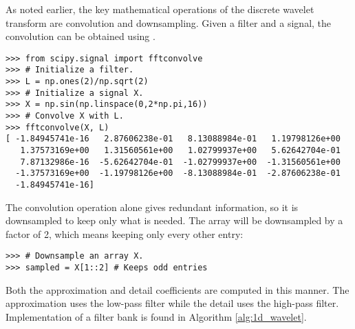 \begin{comment}
At each stage of the algorithm, we filter the signal into an approximation and its details.
Note that the algorithm returns a sequence of one dimensional arrays
\[A_n, D_n, D_{n-1}, \ldots, D_1.\]
If the input signal $X$ has length $2^m$ for
some $m \geq n$ and we are using the Haar wavelet, then $A_n$ has length $2^{m-n}$, and $D_i$ has length $2^{m-i}$
for $i=1,\ldots,n$. The arrays $D_i$ are outputs of the high-pass filter, and thus represent high-frequency
details.
Hence, these arrays are known as \emph{details}.
The array $A_n$ is computed by recursively passing the signal through the low-pass filter, and hence it
represents the low-frequency structure in the signal.
In fact, $A_n$ can be seen as a smoothed approximation of the original signal, and is called the \emph{approximation}.
\end{comment}

As noted earlier, the key mathematical operations of the discrete wavelet transform are convolution and downsampling.
Given a filter and a signal, the convolution can be obtained using .
\begin{lstlisting}
>>> from scipy.signal import fftconvolve
>>> # Initialize a filter.
>>> L = np.ones(2)/np.sqrt(2)
>>> # Initialize a signal X.
>>> X = np.sin(np.linspace(0,2*np.pi,16))
>>> # Convolve X with L.
>>> fftconvolve(X, L)
[ -1.84945741e-16   2.87606238e-01   8.13088984e-01   1.19798126e+00
   1.37573169e+00   1.31560561e+00   1.02799937e+00   5.62642704e-01
   7.87132986e-16  -5.62642704e-01  -1.02799937e+00  -1.31560561e+00
  -1.37573169e+00  -1.19798126e+00  -8.13088984e-01  -2.87606238e-01
  -1.84945741e-16]
\end{lstlisting}

The convolution operation alone gives redundant information, so it is downsampled to keep only what is needed.
The array will be downsampled by a factor of 2, which means keeping only every other entry:

\begin{lstlisting}
>>> # Downsample an array X.
>>> sampled = X[1::2] # Keeps odd entries
\end{lstlisting}

Both the approximation and detail coefficients are computed in this manner.  The approximation uses the low-pass filter while the detail uses the high-pass filter.
Implementation of a filter bank is found in Algorithm \ref{alg:1d_wavelet}.

